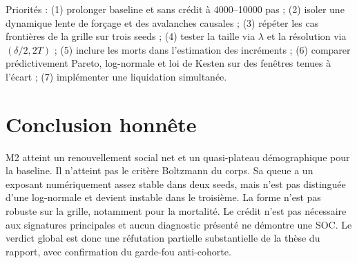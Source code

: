 \documentclass[11pt,a4paper]{article}
\begin{document}
Priorités : (1) prolonger baseline et sans crédit à 4000--10000 pas ; (2) isoler
une dynamique lente de forçage et des avalanches causales ; (3) répéter les cas
frontières de la grille sur trois seeds ; (4) tester la taille via $\lambda$ et
la résolution via $(\delta/2,2T)$ ; (5) inclure les morts dans l'estimation des
incréments ; (6) comparer prédictivement Pareto, log-normale et loi de Kesten sur
des fenêtres tenues à l'écart ; (7) implémenter une liquidation simultanée.

\section{Conclusion honnête}

M2 atteint un renouvellement social net et un quasi-plateau démographique pour
la baseline. Il n'atteint pas le critère Boltzmann du corps. Sa queue a un
exposant numériquement assez stable dans deux seeds, mais n'est pas distinguée
d'une log-normale et devient instable dans le troisième. La forme n'est pas
robuste sur la grille, notamment pour la mortalité. Le crédit n'est pas nécessaire
aux signatures principales et aucun diagnostic présenté ne démontre une SOC.
Le verdict global est donc une réfutation partielle substantielle de la thèse du
rapport, avec confirmation du garde-fou anti-cohorte.
\end{document}
